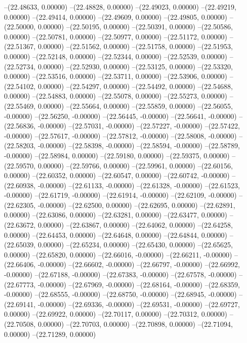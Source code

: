 --(22.48633, 0.00000)
--(22.48828, 0.00000)
--(22.49023, 0.00000)
--(22.49219, 0.00000)
--(22.49414, 0.00000)
--(22.49609, 0.00000)
--(22.49805, 0.00000)
--(22.50000, 0.00000)
--(22.50195, 0.00000)
--(22.50391, 0.00000)
--(22.50586, 0.00000)
--(22.50781, 0.00000)
--(22.50977, 0.00000)
--(22.51172, 0.00000)
--(22.51367, 0.00000)
--(22.51562, 0.00000)
--(22.51758, 0.00000)
--(22.51953, 0.00000)
--(22.52148, 0.00000)
--(22.52344, 0.00000)
--(22.52539, 0.00000)
--(22.52734, 0.00000)
--(22.52930, 0.00000)
--(22.53125, 0.00000)
--(22.53320, 0.00000)
--(22.53516, 0.00000)
--(22.53711, 0.00000)
--(22.53906, 0.00000)
--(22.54102, 0.00000)
--(22.54297, 0.00000)
--(22.54492, 0.00000)
--(22.54688, 0.00000)
--(22.54883, 0.00000)
--(22.55078, 0.00000)
--(22.55273, 0.00000)
--(22.55469, 0.00000)
--(22.55664, 0.00000)
--(22.55859, 0.00000)
--(22.56055, -0.00000)
--(22.56250, -0.00000)
--(22.56445, -0.00000)
--(22.56641, -0.00000)
--(22.56836, -0.00000)
--(22.57031, -0.00000)
--(22.57227, -0.00000)
--(22.57422, -0.00000)
--(22.57617, -0.00000)
--(22.57812, -0.00000)
--(22.58008, -0.00000)
--(22.58203, -0.00000)
--(22.58398, -0.00000)
--(22.58594, -0.00000)
--(22.58789, -0.00000)
--(22.58984, 0.00000)
--(22.59180, 0.00000)
--(22.59375, 0.00000)
--(22.59570, 0.00000)
--(22.59766, 0.00000)
--(22.59961, 0.00000)
--(22.60156, 0.00000)
--(22.60352, 0.00000)
--(22.60547, 0.00000)
--(22.60742, -0.00000)
--(22.60938, -0.00000)
--(22.61133, -0.00000)
--(22.61328, -0.00000)
--(22.61523, -0.00000)
--(22.61719, -0.00000)
--(22.61914, -0.00000)
--(22.62109, -0.00000)
--(22.62305, -0.00000)
--(22.62500, 0.00000)
--(22.62695, 0.00000)
--(22.62891, 0.00000)
--(22.63086, 0.00000)
--(22.63281, 0.00000)
--(22.63477, 0.00000)
--(22.63672, 0.00000)
--(22.63867, 0.00000)
--(22.64062, 0.00000)
--(22.64258, 0.00000)
--(22.64453, 0.00000)
--(22.64648, 0.00000)
--(22.64844, 0.00000)
--(22.65039, 0.00000)
--(22.65234, 0.00000)
--(22.65430, 0.00000)
--(22.65625, 0.00000)
--(22.65820, 0.00000)
--(22.66016, -0.00000)
--(22.66211, -0.00000)
--(22.66406, -0.00000)
--(22.66602, -0.00000)
--(22.66797, -0.00000)
--(22.66992, -0.00000)
--(22.67188, -0.00000)
--(22.67383, -0.00000)
--(22.67578, -0.00000)
--(22.67773, -0.00000)
--(22.67969, -0.00000)
--(22.68164, -0.00000)
--(22.68359, -0.00000)
--(22.68555, -0.00000)
--(22.68750, -0.00000)
--(22.68945, -0.00000)
--(22.69141, -0.00000)
--(22.69336, -0.00000)
--(22.69531, -0.00000)
--(22.69727, 0.00000)
--(22.69922, 0.00000)
--(22.70117, 0.00000)
--(22.70312, 0.00000)
--(22.70508, 0.00000)
--(22.70703, 0.00000)
--(22.70898, 0.00000)
--(22.71094, 0.00000)
--(22.71289, 0.00000)
